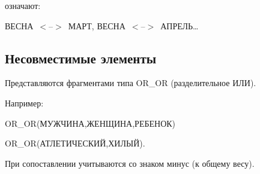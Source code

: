         


             \smallskip


    


    \noindent


означают: 





     \smallskip





{\small





    \noindent


    ВЕСНА~$<$--$>$~МАРТ, ВЕСНА~$<$--$>$~АПРЕЛЬ\ldots 


    }


    





    \subsection{Несовместимые элементы}


    


    Представляются фрагментами типа OR\_OR (разделительное ИЛИ). 


Например: 





     \smallskip


     


     {\small





    \noindent


OR\_OR(МУЖЧИНА,ЖЕНЩИНА,РЕБЕНОК) 





    \noindent


    OR\_OR(АТЛЕТИЧЕСКИЙ,ХИЛЫЙ). 


}





     \smallskip


     





    При сопоставлении учитываются со знаком минус (к общему весу).


